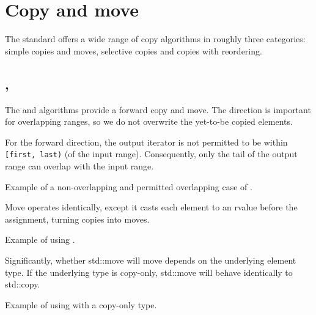 \section{Copy and move}

The standard offers a wide range of copy algorithms in roughly three categories: simple copies and moves, selective copies and copies with reordering.

\subsection{\texorpdfstring{, }{\texttt{std::copy}, \texttt{std::move}}}

The  and  algorithms provide a forward copy and move. The direction is important for overlapping ranges, so we do not overwrite the yet-to-be copied elements.

For the forward direction, the output iterator is not permitted to be within \texttt{[first, last)} (of the input range). Consequently, only the tail of the output range can overlap with the input range.



\begin{box-note}
\footnotesize Example of a non-overlapping and permitted overlapping case of .
\tcblower
{}
\end{box-note}

Move operates identically, except it casts each element to an rvalue before the assignment, turning copies into moves.

\begin{box-note}
\footnotesize Example of using .
\tcblower
{}
\end{box-note}

Significantly, whether std::move will move depends on the underlying element type. If the underlying type is copy-only, std::move will behave identically to std::copy.

\begin{box-note}
\footnotesize Example of using  with a copy-only type.
\tcblower
{}
\end{box-note}



